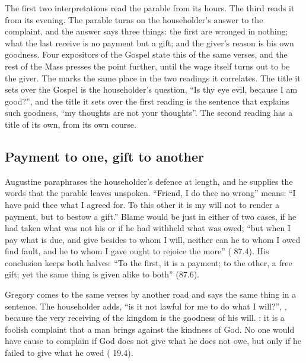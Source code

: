 \label{sec:because-i-am-good}

The first two interpretations read the parable from its hours. The third reads
it from its evening. The parable turns on the householder's answer to the
complaint, and the answer says three things: the first are wronged in nothing;
what the last receive is no payment but a gift; and the giver's reason is his
own goodness. Four expositors of the Gospel state this of the same verses, and
the rest of the Mass presses the point further, until the wage itself turns out
to be the giver. The  marks the same place in the
two readings it correlates. The title it sets over the Gospel is the
householder's question, ``Is thy eye evil, because I am good?'', and the title
it sets over the first reading is the sentence that explains such goodness,
``my thoughts are not your thoughts''. The second reading has a title of its
own, from its own course.

\subsection{Payment to one, gift to another}

Augustine paraphrases the householder's defence at length, and he supplies the
words that the parable leaves unspoken. ``Friend, I do thee no wrong'' means:
``I have paid thee what I agreed for. To this other it is my will not to
render a payment, but to bestow a gift.'' Blame would be just in either of two
cases, if he had taken what was not his or if he had withheld what was owed;
``but when I pay what is due, and give besides to whom I will, neither can he
to whom I owed find fault, and he to whom I gave ought to rejoice the more''
( 87.4). His conclusion keeps both halves: ``To the first, it is a
payment; to the other, a free gift; yet the same thing is given alike to
both'' (87.6).

Gregory comes to the same verses by another road and says the same thing in a
sentence. The householder adds, ``is it not lawful for me to do what I
will?'', ,
because the very receiving of the kingdom is the goodness of his will.
: it is a
foolish complaint that a man brings against the kindness of God. No one would
have cause to complain if God does not give what he does not owe, but only if
he failed to give what he owed ( 19.4).

